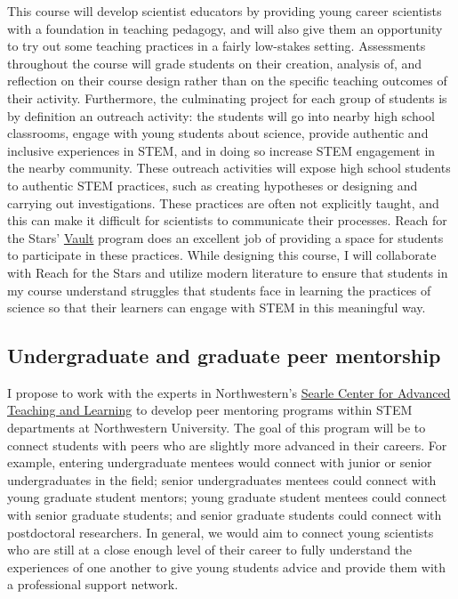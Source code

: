 \documentclass[aasms,11pt]{article}
\begin{document}
This course will develop scientist educators by providing young career scientists with a foundation in teaching pedagogy, and will also give them an opportunity to try out some teaching practices in a fairly low-stakes setting.
Assessments throughout the course will grade students on their creation, analysis of, and reflection on their course design rather than on the specific teaching outcomes of their activity.
Furthermore, the culminating project for each group of students is by definition an outreach activity: the students will go into nearby high school classrooms, engage with young students about science, provide authentic and inclusive experiences in STEM, and in doing so increase STEM engagement in the nearby community.
These outreach activities will expose high school students to authentic STEM practices, such as creating hypotheses or designing and carrying out investigations.
These practices are often not explicitly taught, and this can make it difficult for scientists to communicate their processes.
Reach for the Stars' \href{https://avault.github.io/}{Vault} program does an excellent job of providing a space for students to participate in these practices.
While designing this course, I will collaborate with Reach for the Stars and utilize modern literature \citep[e.g.,][]{dasgupta&all2014} to ensure that students in my course understand struggles that students face in learning the practices of science so that their learners can engage with STEM in this meaningful way.

\subsection{Undergraduate and graduate peer mentorship}
\label{sct:mentoring}
I propose to work with the experts in Northwestern's \href{https://www.northwestern.edu/searle/index.html}{Searle Center for Advanced Teaching and Learning} to develop peer mentoring programs within STEM departments at Northwestern University.
The goal of this program will be to connect students with peers who are slightly more advanced in their careers.
For example, entering undergraduate mentees would connect with junior or senior undergraduates in the field; senior undergraduates mentees could connect with young graduate student mentors; young graduate student mentees could connect with senior graduate students; and senior graduate students could connect with postdoctoral researchers.
In general, we would aim to connect young scientists who are still at a close enough level of their career to fully understand the experiences of one another to give young students advice and provide them with a professional support network.
\end{document}
